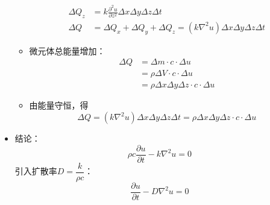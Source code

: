 \begin{itemize}
\begin{itemize}
\begin{equation}
\begin{split}
				\Delta Q_z &= k \frac{\partial^2 u}{\partial z^2}\Delta x \Delta y \Delta z \Delta t\\[0.5em]
				\Delta Q &= \Delta Q_x + \Delta Q_y + \Delta Q_z = (k \nabla^2 u)\Delta x \Delta y \Delta z \Delta t
			\end{split}
		\end{equation}
		\item 微元体总能量增加：
		\begin{equation}
			\begin{split}
				\Delta Q &= \Delta m \cdot c \cdot \Delta u\\
				& = \rho \Delta V \cdot c \cdot \Delta u \\
				& = \rho \Delta x \Delta y \Delta z \cdot c \cdot \Delta u
			\end{split}
		\end{equation}
	\item 由能量守恒，得
	\begin{equation}
		\Delta Q = (k \nabla^2 u)\Delta x \Delta y \Delta z \Delta t = \rho \Delta x \Delta y \Delta z \cdot c \cdot \Delta u
	\end{equation}
	\end{itemize}
\item 结论：
\begin{equation}
	\rho c \dfrac{\partial u}{\partial t} - k \nabla^2 u = 0
\end{equation}
引入扩散率$D = \dfrac{k}{\rho c}$：
\begin{equation}
	\dfrac{\partial u}{\partial t} - D \nabla^2 u = 0
\end{equation}


\end{itemize}
